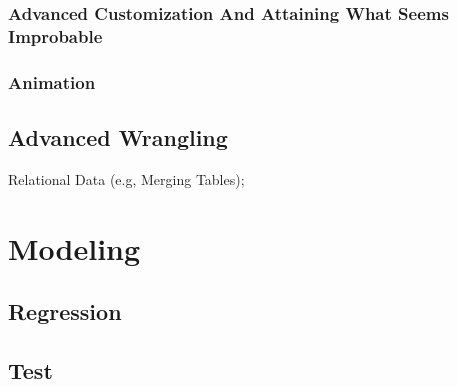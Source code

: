 \documentclass[
]{book}
\begin{document}
\hypertarget{advanced-customization-and-attaining-what-seems-improbable}{%
\subsection{Advanced Customization And Attaining What Seems Improbable}\label{advanced-customization-and-attaining-what-seems-improbable}}

\hypertarget{animation}{%
\subsection{Animation}\label{animation}}

\hypertarget{advanced-wrangling}{%
\section{Advanced Wrangling}\label{advanced-wrangling}}

Relational Data (e.g, Merging Tables);

\hypertarget{modeling}{%
\chapter{Modeling}\label{modeling}}

\hypertarget{regression}{%
\section{Regression}\label{regression}}

\hypertarget{test}{%
\section{Test}\label{test}}

  
\end{document}
